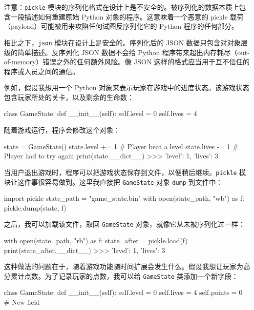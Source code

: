 注意：\texttt{pickle} 模块的序列化格式在设计上是不安全的。被序列化的数据本质上包含一段描述如何重建原始 Python 对象的程序。这意味着一个恶意的 pickle 载荷（payload）可能被用来攻陷任何试图反序列化它的 Python 程序的任何部分。

相比之下，\texttt{json} 模块在设计上是安全的。序列化后的 JSON 数据只包含对对象层级的简单描述。反序列化 JSON 数据不会给 Python 程序带来超出内存耗尽（out-of-memory）错误之外的任何额外风险。像 JSON 这样的格式应当用于互不信任的程序或人员之间的通信。

例如，假设我想用一个 Python 对象来表示玩家在游戏中的进度状态。该游戏状态包含玩家所处的关卡，以及剩余的生命数：

\begin{codebox}[python]
class GameState:
    def __init__(self):
        self.level = 0
        self.lives = 4
\end{codebox}

随着游戏运行，程序会修改这个对象：

\begin{codebox}[python]
state = GameState()
state.level += 1  # Player beat a level
state.lives -= 1  # Player had to try again
print(state.__dict__)
>>>
{'level': 1, 'lives': 3}
\end{codebox}

当用户退出游戏时，程序可以把游戏状态保存到文件，以便稍后继续。\texttt{pickle} 模块让这件事很容易做到。这里我直接把 \texttt{GameState} 对象 \texttt{dump} 到文件中：

\begin{codebox}[python]
import pickle
state_path = "game_state.bin"
with open(state_path, "wb") as f:
    pickle.dump(state, f)
\end{codebox}

之后，我可以加载该文件，取回 \texttt{GameState} 对象，就像它从未被序列化过一样：

\begin{codebox}[python]
with open(state_path, "rb") as f:
    state_after = pickle.load(f)
print(state_after.__dict__)
>>>
{'level': 1, 'lives': 3}
\end{codebox}

这种做法的问题在于，随着游戏功能随时间扩展会发生什么。假设我想让玩家为高分累计点数。为了记录玩家的点数，我可以给 \texttt{GameState} 类添加一个新字段：

\begin{codebox}[python]
class GameState:
    def __init__(self):
        self.level = 0
        self.lives = 4
        self.points = 0  # New field
\end{codebox}

